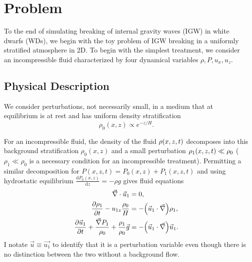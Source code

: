 \documentclass[11pt,
        usenames, %
        dvipsnames %
    ]{article}
\newcommand*{\rd}[2]{\frac{\mathrm{d}#1}{\mathrm{d}#2}}
\newcommand*{\pd}[2]{\frac{\partial#1}{\partial#2}}
\DeclarePairedDelimiter\p{\lparen}{\rparen}
\begin{document}
\def\Snospace~{\S{}} %
\renewcommand*{\sectionautorefname}{\Snospace}
\renewcommand*{\appendixautorefname}{\Snospace}
\renewcommand*{\figureautorefname}{Fig.}
\renewcommand*{\equationautorefname}{Eq.}
\renewcommand*{\tableautorefname}{Tab.}

\onehalfspacing

\section{Problem}

To the end of simulating breaking of internal gravity waves (IGW) in white
dwarfs (WDs), we begin with the toy problem of IGW breaking in a uniformly
stratified atmosphere in 2D. To begin with the simplest treatment, we consider
an incompressible fluid characterized by four dynamical variables $\rho, P, u_x,
u_z$.

\subsection{Physical Description}

We consider perturbations, not necessarily small, in a medium that at
equilibrium is at rest and has uniform density stratification
\begin{equation}
    \rho_0(x, z) \propto e^{-z/H}.
\end{equation}

For an incompressible fluid, the density of the fluid $\rho\p*{x, z, t}$
decomposes into this background stratification $\rho_0(x, z)$ and a small
perturbation $\rho_1\p*{x, z, t} \ll \rho_0$ ($\rho_1 \ll \rho_0$ is a necessary
condition for an incompressible treatment). Permitting a similar decomposition for
$P(x, z, t) = P_0(x, z) + P_1(x, z, t)$ and using hydrostatic equilibrium
$\rd{P_0(x, z)}{z} = -\rho g$ gives fluid equations
\begin{subequations}\label{eq:nonlin_feq}
    \begin{align}
        \vec{\nabla} \cdot \vec{u}_1 &= 0,\\
        \pd{\rho_1}{t} - u_{1z}\frac{\rho_0}{H} &=
            -\p*{\vec{u}_1 \cdot \vec{\nabla}} \rho_1,\\
        \pd{\vec{u}_1}{t} + \frac{\vec{\nabla}P_1}{\rho_0}
            + \frac{\rho_1}{\rho_0}\vec{g} &= -\p*{\vec{u}_1 \cdot \vec{\nabla}}
            \vec{u}_1.
    \end{align}
\end{subequations}
I notate $\vec{u} \equiv \vec{u_1}$ to identify that it is a perturbation
variable even though there is no distinction between the two without a
background flow.
\end{document}
